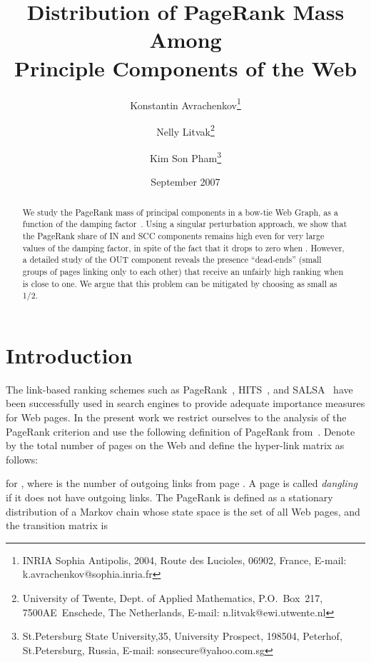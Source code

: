 \documentclass{article}
\begin{document}
\title{Distribution of PageRank Mass Among\\ Principle Components of the Web}

\author{Konstantin Avrachenkov\thanks{ 
INRIA Sophia Antipolis, 2004, Route des Lucioles,
06902, France, E-mail: k.avrachenkov@sophia.inria.fr}
\and Nelly Litvak\thanks{ 
University of Twente, Dept. of Applied Mathematics, P.O.~Box~217,
7500AE~Enschede, The Netherlands,
E-mail: n.litvak@ewi.utwente.nl}
\and Kim Son Pham\thanks{
St.Petersburg State
University,35, University Prospect, 198504, Peterhof, St.Petersburg, Russia,
E-mail: sonsecure@yahoo.com.sg }}

\date{September 2007}

\maketitle

\begin{abstract}
We study the PageRank mass of principal components in a bow-tie Web
Graph, as a function of the damping factor~. Using a singular
perturbation approach, we show that the PageRank share of IN and SCC
components remains high even for very large values of the damping
factor, in spite of the fact that it drops to zero when .
However, a detailed study of the OUT component reveals the presence
``dead-ends'' (small groups of pages linking only to each other)
that receive an unfairly high ranking when  is close to one. We
argue that this problem can be mitigated by choosing  as small as
1/2.
\end{abstract}



\section{Introduction}

The link-based ranking schemes such as PageRank~\cite{Page98},
HITS~\cite{Kleinberg99}, and SALSA~\cite{Lempel00} have been
successfully used in search engines to provide adequate importance
measures for Web pages. In the present work we restrict ourselves to
the analysis of the PageRank criterion and use the following
definition of PageRank from~\cite{Langville03}. Denote by  the
total number of pages on the Web and define the 
hyper-link matrix  as follows:

for , where  is the number of outgoing links from
page . A page is called {\it dangling} if it does not have
outgoing links. The PageRank is defined as a stationary distribution
of a Markov chain whose state space is the set of all Web pages, and
the transition matrix is
\end{document}
